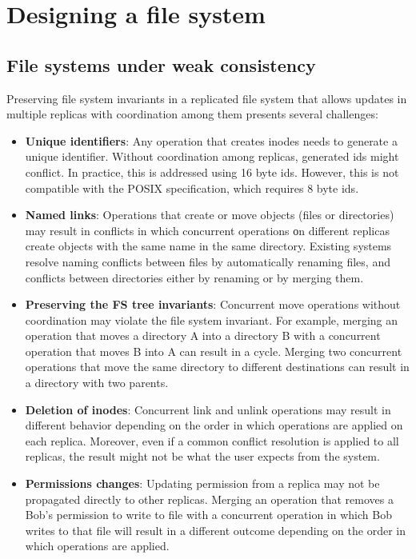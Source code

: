 \documentclass[sigconf,anonymous,10pt]{acmart}
\begin{document}
\section{Designing a file system}

\subsection{File systems under weak consistency}
\label{fs:weak}

Preserving file system invariants in a replicated file system
that allows updates in multiple replicas with coordination
among them presents several challenges:

\begin{itemize}
	\item \textbf{Unique identifiers}: Any operation that creates
	inodes needs to generate a unique identifier.
	Without coordination among replicas, generated ids might conflict.
	In practice, this is addressed using 16 byte ids.
	However, this is not compatible with the POSIX specification, which requires 8 byte ids.
	\item \textbf{Named links}: Operations that create or move objects (files or directories)
	may result in conflicts in which concurrent operations οn different replicas create
	objects with the same name in the same directory.
	Existing systems resolve naming conflicts between files by automatically renaming
  files, and conflicts between directories either by renaming or by merging them.
	\item \textbf{Preserving the FS tree invariants}: Concurrent move
	operations without coordination may violate the file system invariant.
  For example, merging an operation that moves a directory A into a
	directory B with a concurrent operation that moves B into A can result in a cycle.
  Merging two concurrent operations that move the same directory
	to different destinations can result in a directory with two parents.
  \item \textbf{Deletion of inodes}: Concurrent link and unlink operations may result in different behavior depending on the order in which operations are applied on each replica.
  Moreover, even if a common conflict resolution is applied to all replicas, the
  result might not be what the user expects from the system.
  \item \textbf{Permissions changes}: Updating permission from a replica may not
  be propagated directly to other replicas.
  Merging an operation that removes a Bob's permission to write to file with a
  concurrent operation in which Bob writes
  to that file will result in a different outcome depending on the order in which
  operations are applied.
\end{itemize}
\end{document}
